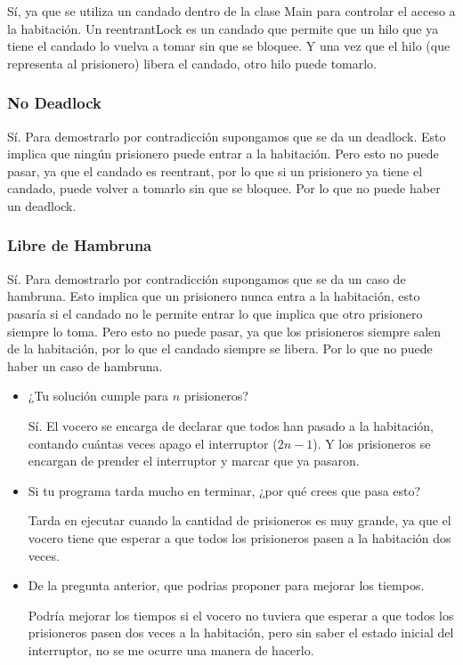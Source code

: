 \documentclass{article}
\begin{document}
Sí, ya que se utiliza un candado dentro de la clase Main para controlar el acceso a la habitación. Un reentrantLock es un candado que permite que un hilo que ya tiene el candado lo vuelva a tomar sin que se bloquee. Y una vez que el hilo (que representa al prisionero) libera el candado, otro hilo puede tomarlo.

\subsubsection*{No Deadlock}
Sí. Para demostrarlo por contradicción supongamos que se da un deadlock. Esto implica que ningún prisionero puede entrar a la habitación. Pero esto no puede pasar, ya que el candado es reentrant, por lo que si un prisionero ya tiene el candado, puede volver a tomarlo sin que se bloquee. Por lo que no puede haber un deadlock. 

\subsubsection*{Libre de Hambruna}

Sí. Para demostrarlo por contradicción supongamos que se da un caso de hambruna. Esto implica que un prisionero nunca entra a la habitación, esto pasaría si el candado no le permite entrar lo que implica que otro prisionero siempre lo toma. Pero esto no puede pasar, ya que los prisioneros siempre salen de la habitación, por lo que el candado siempre se libera. Por lo que no puede haber un caso de hambruna.

\begin{itemize}
    \item ¿Tu solución cumple para $n$ prisioneros?
    
    Sí. El vocero se encarga de declarar que todos han pasado a la habitación, contando cuántas veces apago el interruptor ($2n-1$). Y los prisioneros se encargan de prender el interruptor y marcar que ya pasaron.

    \item Si tu programa tarda mucho en terminar, ¿por qué crees que pasa esto?
    
    Tarda en ejecutar cuando la cantidad de prisioneros es muy grande, ya que el vocero tiene que esperar a que todos los prisioneros pasen a la habitación dos veces.

    \item De la pregunta anterior, que podrias proponer para mejorar los tiempos.
    
    Podría mejorar los tiempos si el vocero no tuviera que esperar a que todos los prisioneros pasen dos veces a la habitación, pero sin saber el estado inicial del interruptor, no se me ocurre una manera de hacerlo.
    
\end{itemize}
\end{document}
